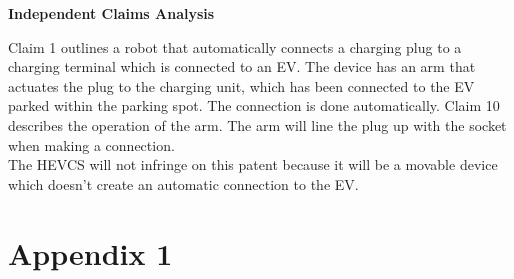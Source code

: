 \documentclass [12pt]{article}
\begin{document}
\textbf{Independent Claims Analysis}

Claim 1 outlines a robot that automatically connects a charging plug to a charging terminal which is connected to an EV. The device has an arm that actuates the plug to the charging unit, which has been connected to the EV parked within the parking spot. The connection is done automatically.
Claim 10 describes the operation of the arm. The arm will line the plug up with the socket when making a connection.
\\
The HEVCS will not infringe on this patent because it will be a movable device which doesn’t create an automatic connection to the EV.


 \newpage
 
 

\newpage
\appendix

\section{Appendix 1}\label{app:appendix_1}
\end{document}
